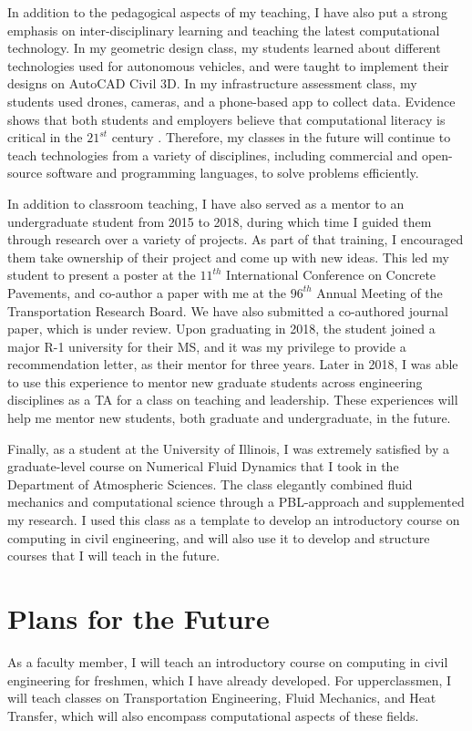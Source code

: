 \documentclass[12pt]{article}
\begin{document}
In addition to the pedagogical aspects of my teaching, I have also put a strong emphasis on inter-disciplinary learning and teaching the latest computational technology. In my geometric design class, my students learned about different technologies used for autonomous vehicles, and were taught to implement their designs on AutoCAD Civil 3D. In my infrastructure assessment class, my students used drones, cameras, and a phone-based app to collect data. Evidence shows that both students and employers believe that computational literacy is critical in the $21^{st}$ century \cite{magana2012motivation}. Therefore, my classes in the future will continue to teach technologies from a variety of disciplines, including commercial and open-source software and programming languages, to solve problems efficiently. 

In addition to classroom teaching, I have also served as a mentor to an undergraduate student from 2015 to 2018, during which time I guided them through research over a variety of projects. As part of that training, I encouraged them take ownership of their project and come up with new ideas. This led my student to present a poster at the $11^{th}$ International Conference on Concrete Pavements, and co-author a paper with me at the $96^{th}$ Annual Meeting of the Transportation Research Board. We have also submitted a co-authored journal paper, which is under review. Upon graduating in 2018, the student joined a major R-1 university for their MS, and it was my privilege to provide a recommendation letter, as their mentor for three years. Later in 2018, I was able to use this experience to mentor new graduate students across engineering disciplines as a TA for a class on teaching and leadership. These experiences will help me mentor new students, both graduate and undergraduate, in the future.

Finally, as a student at the University of Illinois, I was extremely satisfied by a graduate-level course on Numerical Fluid Dynamics that I took in the Department of Atmospheric Sciences. The class elegantly combined fluid mechanics and computational science through a PBL-approach and supplemented my research. I used this class as a template to develop an introductory course on computing in civil engineering, and will also use it to develop and structure courses that I will teach in the future.  

\section*{Plans for the Future}
As a faculty member, I will teach an introductory course on computing in civil engineering for freshmen, which I have already developed. For upperclassmen, I will teach classes on Transportation Engineering, Fluid Mechanics, and Heat Transfer, which will also encompass computational aspects of these fields. 
\end{document}
